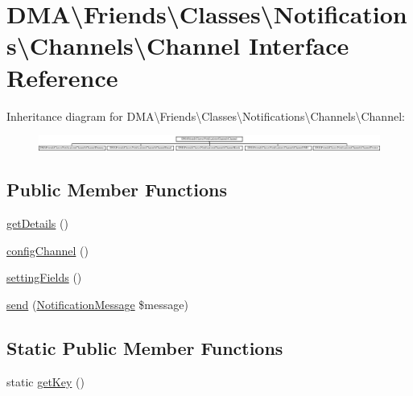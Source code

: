 \hypertarget{interfaceDMA_1_1Friends_1_1Classes_1_1Notifications_1_1Channels_1_1Channel}{\section{D\+M\+A\textbackslash{}Friends\textbackslash{}Classes\textbackslash{}Notifications\textbackslash{}Channels\textbackslash{}Channel Interface Reference}
\label{interfaceDMA_1_1Friends_1_1Classes_1_1Notifications_1_1Channels_1_1Channel}
}
Inheritance diagram for D\+M\+A\textbackslash{}Friends\textbackslash{}Classes\textbackslash{}Notifications\textbackslash{}Channels\textbackslash{}Channel\+:\begin{figure}[H]
\begin{center}
\leavevmode
\includegraphics[height=0.510018cm]{da/d85/interfaceDMA_1_1Friends_1_1Classes_1_1Notifications_1_1Channels_1_1Channel}
\end{center}
\end{figure}
\subsection*{Public Member Functions}
\begin{DoxyCompactItemize}
\item 
\hyperlink{interfaceDMA_1_1Friends_1_1Classes_1_1Notifications_1_1Channels_1_1Channel_a78e25e374398ef085f37fb8d22203bdb}{get\+Details} ()
\item 
\hyperlink{interfaceDMA_1_1Friends_1_1Classes_1_1Notifications_1_1Channels_1_1Channel_a63df08fbca39589ea32f729d9485cb37}{config\+Channel} ()
\item 
\hyperlink{interfaceDMA_1_1Friends_1_1Classes_1_1Notifications_1_1Channels_1_1Channel_aa473115fa58a6fa5f57a9069f23dd771}{setting\+Fields} ()
\item 
\hyperlink{interfaceDMA_1_1Friends_1_1Classes_1_1Notifications_1_1Channels_1_1Channel_a8138dfd93ce9617213637789e793f4c7}{send} (\hyperlink{classDMA_1_1Friends_1_1Classes_1_1Notifications_1_1NotificationMessage}{Notification\+Message} \$message)
\end{DoxyCompactItemize}
\subsection*{Static Public Member Functions}
\begin{DoxyCompactItemize}
\item 
static \hyperlink{interfaceDMA_1_1Friends_1_1Classes_1_1Notifications_1_1Channels_1_1Channel_a53b32a2d7c27477655a9d4b87164c203}{get\+Key} ()
\end{DoxyCompactItemize}


